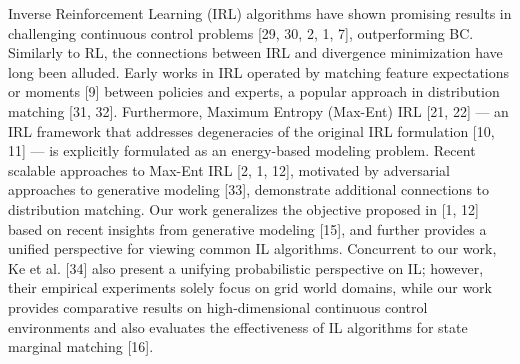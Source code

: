 Inverse Reinforcement Learning (IRL) algorithms have shown promising results in challenging continuous control problems [29, 30, 2, 1, 7], outperforming BC. 
Similarly to RL, the connections between IRL and divergence minimization have long been alluded. 
Early works in IRL operated by matching feature expectations or moments [9] between policies and experts, a popular approach in distribution matching [31, 32]. 
Furthermore, Maximum Entropy (Max-Ent) IRL [21, 22] — an IRL framework that addresses degeneracies of the original IRL formulation [10, 11] — is explicitly formulated as an energy-based modeling problem. 
Recent scalable approaches to Max-Ent IRL [2, 1, 12], motivated by adversarial approaches to generative modeling [33], demonstrate additional connections to distribution matching. 
Our work generalizes the objective proposed in [1, 12] based on recent insights from generative modeling [15], and further provides a unified perspective for viewing common IL algorithms. 
Concurrent to our work, Ke et al. [34] also present a unifying probabilistic perspective on IL; 
however, their empirical experiments solely focus on grid world domains, while our work provides comparative results on high-dimensional continuous control environments and also evaluates the effectiveness of IL algorithms for state marginal matching [16].
